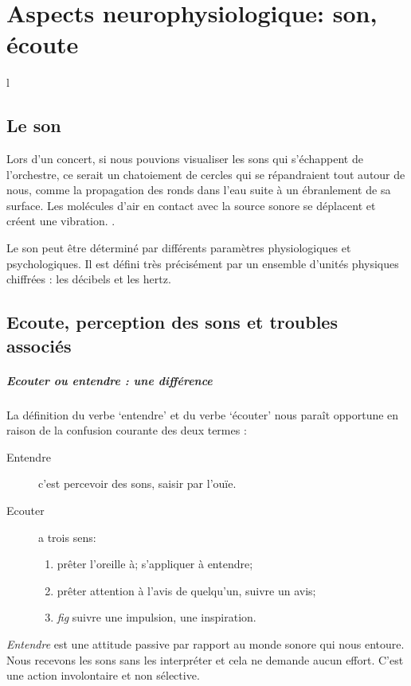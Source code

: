 
\chapter{Aspects neurophysiologique: son, écoute}

l
\section{Le son}

Lors d'un concert, si nous pouvions visualiser les sons qui
s'échappent de l'orchestre, ce serait un chatoiement de cercles qui se
répandraient tout autour de nous, comme 
la propagation des
ronds dans l'eau suite à un ébranlement de sa surface.
Les molécules d'air en contact avec la source sonore se déplacent et
créent une vibration. \autocite[p. 183]{bencivelli:pourquoi,}.


Le son peut être déterminé par différents paramètres
physiologiques et psychologiques.
Il est défini très précisément par un ensemble d'unités physiques chiffrées
: les décibels  et les hertz. 




\section{Ecoute, perception des sons et troubles associés}
\paragraph{Ecouter ou entendre : une différence}

La définition du verbe `entendre' et du verbe `écouter' 
\autocite[pp. 361--385]{hachette:dictionnaire} nous paraît opportune
en raison de la confusion courante des deux termes :
\begin{description}
\item[Entendre] c'est  percevoir des sons, saisir par l'ouïe.
\item[Ecouter] a trois sens: 
\begin{enumerate}
	\item prêter l'oreille à; s'appliquer à entendre;
	\item prêter attention à l'avis de quelqu'un, suivre un avis;
	\item \emph{fig} suivre une impulsion,	une inspiration.
\end{enumerate}
\end{description}

\emph{Entendre} est une attitude passive par rapport au monde sonore
qui nous entoure. Nous recevons les sons sans les interpréter et cela
ne demande aucun effort. C'est une action involontaire et non
sélective.

